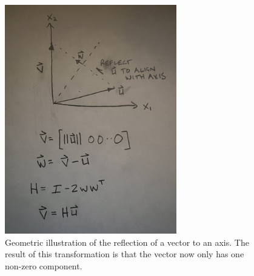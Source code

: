 \documentclass{article}
\begin{document}
\begin{figure}[h]
\centering
\includegraphics[width=75mm, angle=-90]{Householder2}
\caption{Geometric illustration of the reflection of a vector to an axis. The result of this transformation is that the vector now only has one non-zero component.}
\end{figure}
\end{document}
